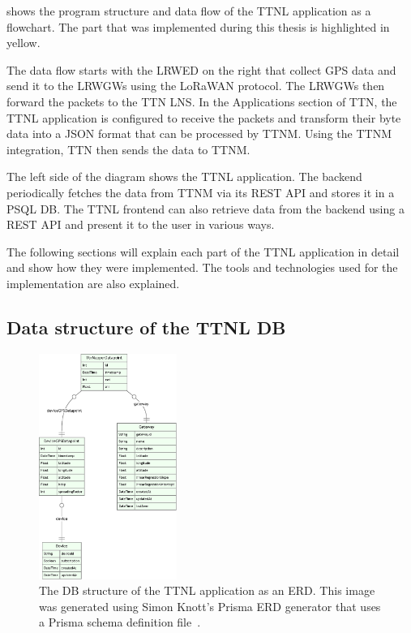  shows the program structure and data flow of the \ac{TTNL} application as a flowchart.
The part that was implemented during this thesis is highlighted in yellow.

The data flow starts with the \acl{LRWED} on the right that collect \ac{GPS} data and send it to the \aclp{LRWGW} using the \ac{LoRaWAN} protocol.
The \aclp{LRWGW} then forward the packets to the \ac{TTN} \ac{LNS}.
In the Applications section of \ac{TTN}, the \ac{TTNL} application is configured to receive the packets and transform their byte data into a \ac{JSON} format that can be processed by \ac{TTNM}.
Using the \ac{TTNM} integration, \ac{TTN} then sends the data to \ac{TTNM}.

The left side of the diagram shows the \ac{TTNL} application.
The backend periodically fetches the data from \ac{TTNM} via its \ac{REST} \ac{API} and stores it in a \ac{PSQL} \ac{DB}.
The \ac{TTNL} frontend can also retrieve data from the backend using a \ac{REST} \ac{API} and present it to the user in various ways.

The following sections will explain each part of the \ac{TTNL} application in detail and show how they were implemented.
The tools and technologies used for the implementation are also explained.

\subsection{Data structure of the \acl{TTNL} \acl{DB}}

\begin{figure}[htbp]
    \centering
    \includegraphics[width=0.4\textwidth]{pictures/ttn-locator/backend/prisma-erd.eps}
    \caption[\acl{DB} structure of the \acl{TTNL} application as an \acl{ERD}]{
        The \ac{DB} structure of the \ac{TTNL} application as an \ac{ERD}.
        This image was generated using Simon Knott's Prisma ERD generator that uses a Prisma schema definition file~\cite{simon_knott_prisma_2023}.
    }\label{pic:prisma-erd}
\end{figure}

